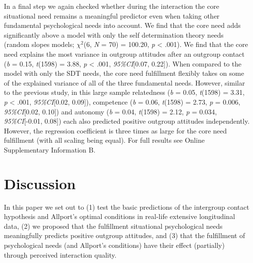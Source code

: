 \documentclass[man, 12pt, a4paper]{apa7}
\theoremstyle{break}
\theoremstyle{plain}
\begin{document}
In a final step we again checked whether during the interaction the core
situational need remains a meaningful predictor even when taking other
fundamental psychological needs into account. We find that the core need
adds significantly above a model with only the self determination theory
needs (random slopes models; \(\chi^2\)(6, \textit{N} = 70) = 100.20,
\textit{p} \textless{} .001). We find that the core need explains the
most variance in outgroup attitudes after an outgroup contact
(\textit{b} = 0.15, \textit{t}(1598) = 3.88, \textit{p} \textless{}
.001, \textit{95\%CI}{[}0.07, 0.22{]}). When compared to the model with
only the SDT needs, the core need fulfillment flexibly takes on some of
the explained variance of all of the three fundamental needs. However,
similar to the previous study, in this large sample relatedness
(\textit{b} = 0.05, \textit{t}(1598) = 3.31, \textit{p} \textless{}
.001, \textit{95\%CI}{[}0.02, 0.09{]}), competence (\textit{b} = 0.06,
\textit{t}(1598) = 2.73, \textit{p} = 0.006, \textit{95\%CI}{[}0.02,
0.10{]}) and autonomy (\textit{b} = 0.04, \textit{t}(1598) = 2.12,
\textit{p} = 0.034, \textit{95\%CI}{[}-0.01, 0.08{]}) each also
predicted positive outgroup attitudes independently. However, the
regression coefficient is three times as large for the core need
fulfillment (with all scaling being equal). For full results see Online
Supplementary Information B.











\section{Discussion}
In this paper we set out to (1) test the basic predictions of the intergroup contact hypothesis and Allport's optimal conditions in real-life extensive longitudinal data, (2) we proposed that the fulfillment situational psychological needs meaningfully predicts positive outgroup attitudes, and (3) that the fulfillment of psychological needs (and Allport's conditions) have their effect (partially) through perceived interaction quality. 
\end{document}
